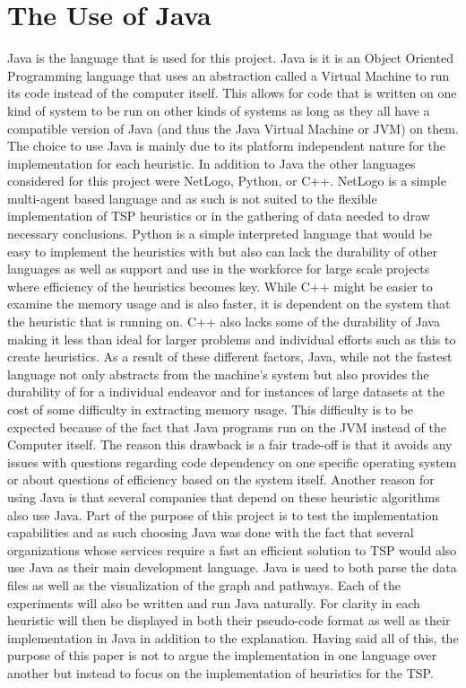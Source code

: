 \documentclass[midd]{thesis}
\newcommand{\tab}{\hspace*{2em}}
\begin{document}
\appendix
\chapter{The Use of Java}
\tab Java is the language that is used for this project. Java is it is an Object Oriented Programming language that uses an abstraction called a Virtual Machine to run its code instead of the computer itself. This allows for code that is written on one kind of system to be run on other kinds of systems as long as they all have a compatible version of Java (and thus the Java Virtual Machine or JVM) on them. The choice to use Java is mainly due to its platform independent nature for the implementation for each heuristic. In addition to Java the other languages considered for this project were NetLogo, Python, or C++. NetLogo is a simple multi-agent based language and as such is not suited to the flexible implementation of TSP heuristics or in the gathering of data needed to draw necessary conclusions. Python is a simple interpreted language that would be easy to implement the heuristics with but also can lack the durability of other languages as well as support and use in the workforce for large scale projects where efficiency of the heuristics becomes key.  While C++ might be easier to examine the memory usage and is also faster, it is dependent on the system that the heuristic that is running on. C++ also lacks some of the durability of Java making it less than ideal for larger problems and individual efforts such as this to create heuristics. As a result of these different factors, Java, while not the fastest language not only abstracts from the machine's system but also provides the durability of for a individual endeavor and for instances of large datasets at the cost of some difficulty in extracting memory usage. This difficulty is to be expected because of the fact that Java programs run on the JVM instead of the Computer itself. The reason this drawback is a fair trade-off is that it avoids any issues with questions regarding code dependency on one specific operating system or about questions of efficiency based on the system itself. Another reason for using Java is that several companies that depend on these heuristic algorithms also use Java. Part of the purpose of this project is to test the implementation capabilities and as such choosing Java was done with the fact that several organizations whose services require a fast an efficient solution to TSP would also use Java as their main development language. Java is  used to both parse the data files as well as the visualization of the graph and pathways. Each of the experiments will also be written and run Java naturally. For clarity in each heuristic will then  be displayed in both their pseudo-code format as well as their implementation in Java in addition to the  explanation. Having said all of this, the purpose of this paper is not to argue the implementation in one language over another but instead to focus on the implementation of heuristics for the TSP.\\


\end{document}
